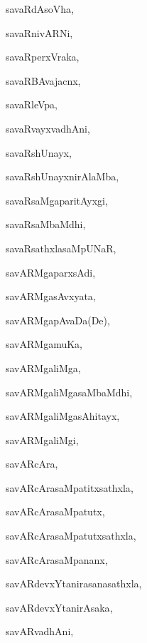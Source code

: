 \begin{multicols}{3}
{\noindent
{savaRdAsoVha}, \pageref{savaRdAsoVha}

\noindent
{savaRnivARNi}, \pageref{savaRnivARNi}

\noindent
{savaRperxVraka}, \pageref{savaRperxVraka}

\noindent
{savaRBAvajacnx}, \pageref{savaRBAvajacnx}

\noindent
{savaRleVpa}, \pageref{savaRleVpa}

\noindent
{savaRvayxvadhAni}, \pageref{savaRvayxvadhAni}

\noindent
{savaRshUnayx}, \pageref{savaRshUnayx}

\noindent
{savaRshUnayxnirAlaMba}, \pageref{savaRshUnayxnirAlaMba}

\noindent
{savaRsaMgaparitAyxgi}, \pageref{savaRsaMgaparitAyxgi}

\noindent
{savaRsaMbaMdhi}, \pageref{savaRsaMbaMdhi}

\noindent
{savaRsathxlasaMpUNaR}, \pageref{savaRsathxlasaMpUNaR}

\noindent
{savARMgaparxsAdi}, \pageref{savARMgaparxsAdi}

\noindent
{savARMgasAvxyata}, \pageref{savARMgasAvxyata}

\noindent
{savARMgapAvaDa(De)}, \pageref{savARMgapAvaDaDe}

\noindent
{savARMgamuKa}, \pageref{savARMgamuKa}

\noindent
{savARMgaliMga}, \pageref{savARMgaliMga}

\noindent
{savARMgaliMgasaMbaMdhi}, \pageref{savARMgaliMgasaMbaMdhi}

\noindent
{savARMgaliMgasAhitayx}, \pageref{savARMgaliMgasAhitayx}

\noindent
{savARMgaliMgi}, \pageref{savARMgaliMgi}

\noindent
{savARcAra}, \pageref{savARcAra}

\noindent
{savARcArasaMpatitxsathxla}, \pageref{savARcArasaMpatitxsathxla}

\noindent
{savARcArasaMpatutx}, \pageref{savARcArasaMpatutx}

\noindent
{savARcArasaMpatutxsathxla}, \pageref{savARcArasaMpatutxsathxla}

\noindent
{savARcArasaMpananx}, \pageref{savARcArasaMpananx}

\noindent
{savARdevxYtanirasanasathxla}, \pageref{savARdevxYtanirasanasathxla}

\noindent
{savARdevxYtanirAsaka}, \pageref{savARdevxYtanirAsaka}

\noindent
{savARvadhAni}, \pageref{savARvadhAni}

}
\end{multicols}
